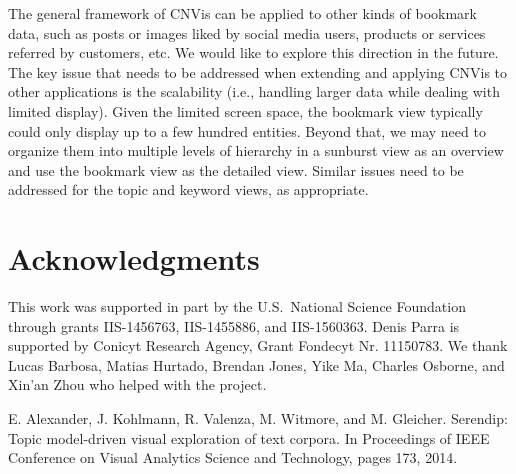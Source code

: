 \documentclass[letterpaper,twocolumn,fleqn]{article}
\begin{document}
The general framework of CNVis can be applied to other kinds of bookmark data, such as posts or images liked by social media users, products or services referred by customers, etc. We would like to explore this direction in the future. The key issue that needs to be addressed when extending and applying CNVis to other applications is the scalability (i.e., handling larger data while dealing with limited display). Given the limited screen space, the bookmark view typically could only display up to a few hundred entities. Beyond that, we may need to organize them into multiple levels of hierarchy in a sunburst view as an overview and use the bookmark view as the detailed view. Similar issues need to be addressed for the topic and keyword views, as appropriate. 

\section{Acknowledgments}
This work was supported in part by the U.S.\ National Science Foundation through grants IIS-1456763, IIS-1455886, and IIS-1560363. Denis Parra is supported by Conicyt Research Agency, Grant Fondecyt Nr. 11150783. We thank Lucas Barbosa, Matias Hurtado, Brendan Jones, Yike Ma, Charles Osborne, and Xin'an Zhou who helped with the project. 


\small
\begin{thebibliography}{9}

E. Alexander, J. Kohlmann, R. Valenza, M. Witmore, and M. Gleicher. Serendip: Topic model-driven visual exploration of text corpora. In Proceedings of IEEE Conference on Visual Analytics Science and Technology, pages 173, 2014.


\end{thebibliography}
\end{document}
